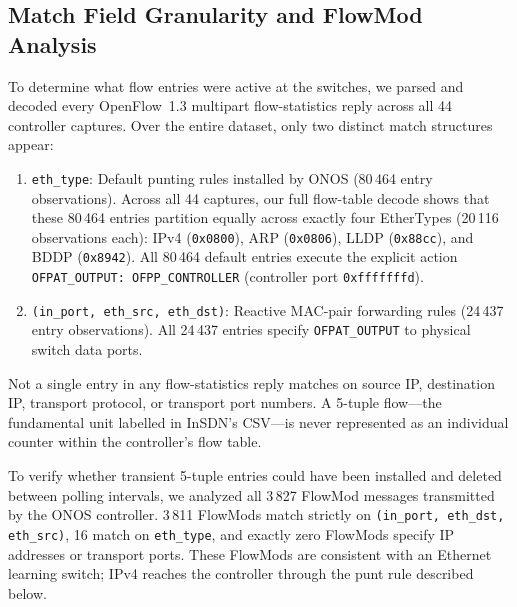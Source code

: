 \documentclass[journal]{IEEEtran}
\begin{document}
\subsection{Match Field Granularity and FlowMod Analysis}
To determine what flow entries were active at the switches, we parsed and decoded every OpenFlow~1.3 multipart flow-statistics reply across all 44 controller captures. Over the entire dataset, only two distinct match structures appear:
\begin{enumerate}
    \item \texttt{eth\_type}: Default punting rules installed by ONOS (80\,464 entry observations). Across all 44 captures, our full flow-table decode shows that these 80\,464 entries partition equally across exactly four EtherTypes (20\,116 observations each): IPv4 (\texttt{0x0800}), ARP (\texttt{0x0806}), LLDP (\texttt{0x88cc}), and BDDP (\texttt{0x8942}). All 80\,464 default entries execute the explicit action \texttt{OFPAT\_OUTPUT: OFPP\_CONTROLLER} (controller port \texttt{0xfffffffd}).
    \item \texttt{(in\_port, eth\_src, eth\_dst)}: Reactive MAC-pair forwarding rules (24\,437 entry observations). All 24\,437 entries specify \texttt{OFPAT\_OUTPUT} to physical switch data ports.
\end{enumerate}
Not a single entry in any flow-statistics reply matches on source IP, destination IP, transport protocol, or transport port numbers. A 5-tuple flow---the fundamental unit labelled in InSDN's CSV---is never represented as an individual counter within the controller's flow table.

To verify whether transient 5-tuple entries could have been installed and deleted between polling intervals, we analyzed all 3\,827 FlowMod messages transmitted by the ONOS controller. 3\,811 FlowMods match strictly on \texttt{(in\_port, eth\_dst, eth\_src)}, 16 match on \texttt{eth\_type}, and exactly zero FlowMods specify IP addresses or transport ports. These FlowMods are consistent with an Ethernet learning switch; IPv4 reaches the controller through the punt rule described below.
\end{document}
